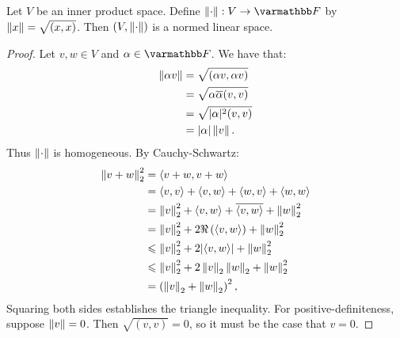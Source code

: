 \begin{proposition}
    Let $V$ be an inner product space. Define $\lnorm \cdot \rnorm:V \rightarrow \bfF$ by $\left\lVert x \right\rVert = \sqrt{(x,x)}$. Then $(V,\left\lVert \cdot \right\rVert)$ is a normed linear space.
\end{proposition}
    \begin{proof}
            Let $v,w \in V$ and $\alpha \in \bfF$. We have that:
                \begin{equation*}
                \begin{split}
                    \left\lVert \alpha v \right\rVert 
                    & = \sqrt{(\alpha v , \alpha v )} \\
                    & = \sqrt{ \alpha \overline{\alpha}( v,v )} \\
                    & = \sqrt{ |\alpha|^2 ( v,v )}\\
                    & = |\alpha|\left\lVert v \right\rVert.
                \end{split}
                \end{equation*}
            Thus $\left\lVert \cdot \right\rVert$ is homogeneous. By Cauchy-Schwartz:
                \begin{equation*}
                \begin{split}
                    \left\lVert v+w \right\rVert_2^2
                    & = \langle v+w,v+w \rangle \\
                    & = \langle v,v \rangle + \langle v,w \rangle + \langle w,v \rangle + \langle w,w \rangle \\
                    & = \left\lVert v \right\rVert_2^2 + \langle v,w \rangle + \overline{\langle v,w \rangle} + \left\lVert w \right\rVert_2^2 \\
                    & = \left\lVert v \right\rVert_2^2 + 2\Re \left( \langle v,w \rangle \right) + \left\lVert w \right\rVert_2^2 \\
                    & \leqslant \left\lVert v \right\rVert_2^2 + 2|\langle v,w \rangle| + \left\lVert w \right\rVert_2^2 \\
                    & \leqslant \left\lVert v \right\rVert_2^2 + 2 \left\lVert v \right\rVert_2 \left\lVert w \right\rVert_2 + \left\lVert w \right\rVert_2^2 \\
                    & = \left( \left\lVert v \right\rVert_2 + \left\lVert w \right\rVert_2 \right)^2,
                \end{split}
                \end{equation*}
            Squaring both sides establishes the triangle inequality. For positive-definiteness, suppose $\left\lVert v \right\rVert = 0$. Then $\sqrt{( v,v )} = 0$, so it must be the case that $v = 0 $.
        \end{proof}

